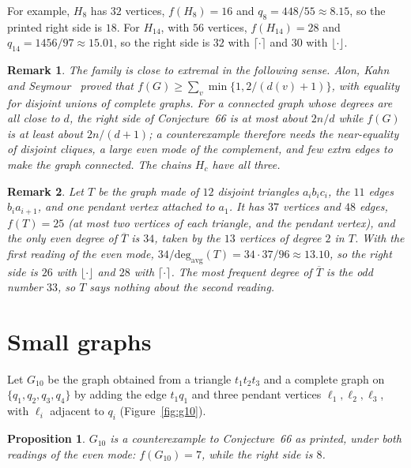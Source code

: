 \documentclass[10pt,a4paper]{article}
\newtheorem{proposition}{Proposition}[section]
\newtheorem{remark}{Remark}[section]
\newcommand{\davg}{\operatorname{deg_{avg}}}
\begin{document}
For example, $H_8$ has $32$ vertices, $f(H_8)=16$ and $q_8=448/55\approx8.15$, so the printed right side is $18$. For $H_{14}$, with $56$ vertices, $f(H_{14})=28$ and $q_{14}=1456/97\approx15.01$, so the right side is $32$ with $\lceil\cdot\rceil$ and $30$ with $\lfloor\cdot\rfloor$.

\begin{remark}
The family is close to extremal in the following sense. Alon, Kahn and Seymour~\cite{AKS1987} proved that $f(G)\ge\sum_v\min\{1,2/(d(v)+1)\}$, with equality for disjoint unions of complete graphs. For a connected graph whose degrees are all close to $d$, the right side of Conjecture~66 is at most about $2n/d$ while $f(G)$ is at least about $2n/(d+1)$; a counterexample therefore needs the near-equality of disjoint cliques, a large even mode of the complement, and few extra edges to make the graph connected. The chains $H_c$ have all three.
\end{remark}

\begin{remark}\label{rem:37}
Let $T$ be the graph made of $12$ disjoint triangles $a_ib_ic_i$, the $11$ edges $b_ia_{i+1}$, and one pendant vertex attached to $a_1$. It has $37$ vertices and $48$ edges, $f(T)=25$ (at most two vertices of each triangle, and the pendant vertex), and the only even degree of $\overline T$ is $34$, taken by the $13$ vertices of degree $2$ in $T$. With the first reading of the even mode, $34/\davg(T)=34\cdot37/96\approx13.10$, so the right side is $26$ with $\lfloor\cdot\rfloor$ and $28$ with $\lceil\cdot\rceil$. The most frequent degree of $\overline T$ is the odd number $33$, so $T$ says nothing about the second reading.
\end{remark}

\section{Small graphs}\label{sec:search}

Let $G_{10}$ be the graph obtained from a triangle $t_1t_2t_3$ and a complete graph on $\{q_1,q_2,q_3,q_4\}$ by adding the edge $t_1q_1$ and three pendant vertices $\ell_1,\ell_2,\ell_3$, with $\ell_i$ adjacent to $q_i$ (Figure~\ref{fig:g10}).

\begin{proposition}\label{prop:g10}
$G_{10}$ is a counterexample to Conjecture~66 as printed, under both readings of the even mode: $f(G_{10})=7$, while the right side is $8$.
\end{proposition}
\end{document}
